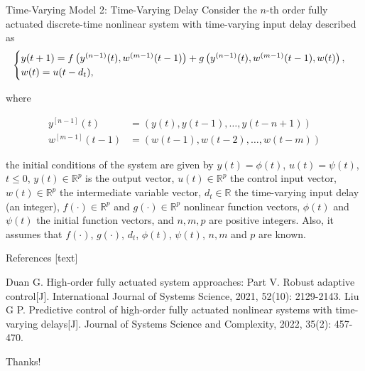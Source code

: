 \documentclass{beamer}
\begin{document}
\begin{frame}{Time-Varying Model 2: Time-Varying Delay{}}
Consider the \(n\)-th order fully actuated discrete-time nonlinear system with time-varying input delay described as
\begin{equation}
    \begin{cases}
      y(t + 1) = f\left(y^{(n-1)}(t), w^{(m-1)}(t - 1)\right) + g\left(y^{(n-1)}(t), w^{(m-1)}(t - 1), w(t)\right), \\
      w(t) = u(t - d_t),
    \end{cases}\notag
\end{equation}

where

$$
\begin{aligned}
y^{[n-1]}(t) &= (y(t), y(t-1), \ldots, y(t-n+1))\\
w^{[m-1]}(t - 1) &= (w(t - 1), w(t - 2), \ldots, w(t-m))
\end{aligned}
$$

the initial conditions of the system are given by \( y(t) = \phi(t) \), \( u(t) = \psi(t) \), \( t \leq 0 \), \( y(t) \in \mathbb{R}^p \) is the output vector, \( u(t) \in \mathbb{R}^p \) the control input vector, \( w(t) \in \mathbb{R}^p \) the intermediate variable vector, \( d_t \in \mathbb{R} \) the \alert{time-varying} input delay (an integer), \( f(\cdot) \in \mathbb{R}^p \) and \( g(\cdot) \in \mathbb{R}^p \) nonlinear function vectors, \( \phi(t) \) and \( \psi(t) \) the initial function vectors, and \( n, m, p \) are positive integers. Also, it assumes that \( f(\cdot) \), \( g(\cdot) \), \( d_t \), \( \phi(t) \), \( \psi(t) \), \( n, m \) and \( p \) are known.

\end{frame}

\begin{frame}{References}
[text]

\begin{thebibliography}{10} %
\bibitem{}
Duan G. High-order fully actuated system approaches: Part V. Robust adaptive control[J]. International Journal of Systems Science, 2021, 52(10): 2129-2143.
\bibitem{}
Liu G P. Predictive control of high-order fully actuated nonlinear systems with time-varying delays[J]. Journal of Systems Science and Complexity, 2022, 35(2): 457-470.
\end{thebibliography}
\end{frame}

\begin{frame}
\Huge{\centerline{Thanks!}}
\end{frame}
\end{document}
